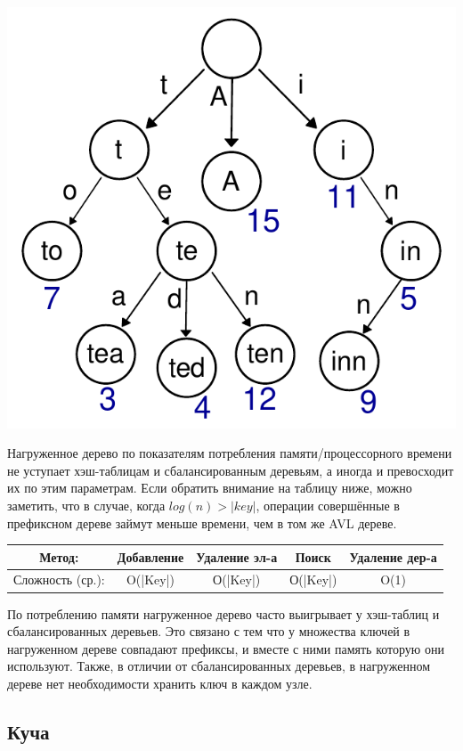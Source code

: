 \documentclass[utf8,14pt,a4paper,oneside,russian]{book}
\begin{document}
	\begin{center}
		\includegraphics[scale=1]{trie}\\
	\end{center}
	
	Нагруженное дерево по показателям потребления памяти/процессорного времени не уступает хэш-таблицам и сбалансированным деревьям, а иногда и превосходит их по этим параметрам. Если обратить внимание на таблицу ниже, можно заметить, что в случае, когда $log(n)>|key|$, операции совершённые в префиксном дереве займут меньше времени, чем в том же AVL дереве.
	
	\begin{longtable}{c|c|c|c|c}
		Метод: &Добавление&Удаление эл-а&Поиск&Удаление дер-а\\\hline
		Сложность (ср.): &O(|Key|)&О(|Key|)&О(|Key|)&O(1)\\
	\end{longtable}

	По потреблению памяти нагруженное дерево часто выигрывает у хэш-таблиц и сбалансированных деревьев. Это связано с тем что у множества ключей в нагруженном дереве совпадают префиксы, и вместе с ними память которую они используют. Также, в отличии от сбалансированных деревьев, в нагруженном дереве нет необходимости хранить ключ в каждом узле.
	
	\subsection{Куча}
	
\end{document}

